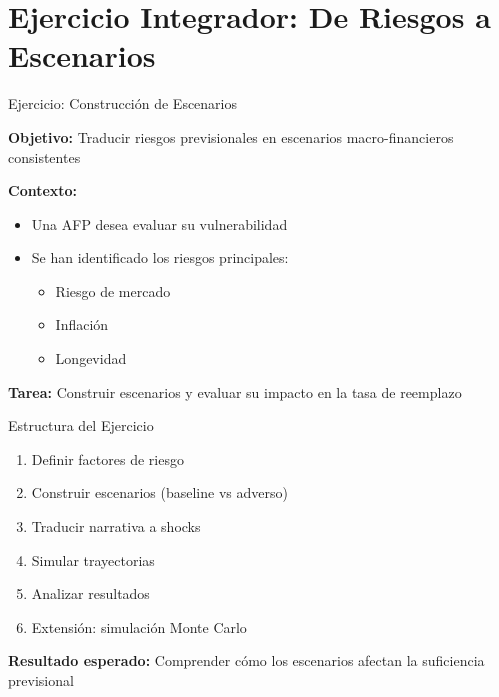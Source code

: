 \documentclass{beamer}
\begin{document}
\section{Ejercicio Integrador: De Riesgos a Escenarios}

\begin{frame}{Ejercicio: Construcción de Escenarios}

\textbf{Objetivo:}  
Traducir riesgos previsionales en escenarios macro-financieros consistentes

\vspace{0.4cm}

\textbf{Contexto:}
\begin{itemize}
\item Una AFP desea evaluar su vulnerabilidad
\item Se han identificado los riesgos principales:
\begin{itemize}
\item Riesgo de mercado
\item Inflación
\item Longevidad
\end{itemize}
\end{itemize}

\vspace{0.4cm}

\textbf{Tarea:}  
Construir escenarios y evaluar su impacto en la tasa de reemplazo

\end{frame}

\begin{frame}{Estructura del Ejercicio}

\begin{enumerate}
\item Definir factores de riesgo
\item Construir escenarios (baseline vs adverso)
\item Traducir narrativa a shocks
\item Simular trayectorias
\item Analizar resultados
\item Extensión: simulación Monte Carlo
\end{enumerate}

\vspace{0.4cm}

\textbf{Resultado esperado:}  
Comprender cómo los escenarios afectan la suficiencia previsional

\end{frame}
\end{document}
